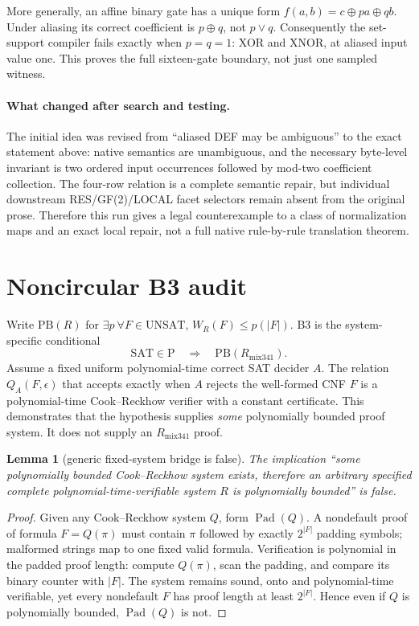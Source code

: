 \documentclass[11pt]{article}
\newtheorem{lemma}{Lemma}
\begin{document}
More generally, an affine binary gate has a unique form $f(a,b)=c\oplus pa\oplus qb$.  Under aliasing its correct coefficient is $p\oplus q$, not $p\lor q$.  Consequently the set-support compiler fails exactly when $p=q=1$: XOR and XNOR, at aliased input value one.  This proves the full sixteen-gate boundary, not just one sampled witness.

\paragraph{What changed after search and testing.}
The initial idea was revised from ``aliased DEF may be ambiguous'' to the exact statement above: native semantics are unambiguous, and the necessary byte-level invariant is two ordered input occurrences followed by mod-two coefficient collection.  The four-row relation is a complete semantic repair, but individual downstream RES/GF(2)/LOCAL facet selectors remain absent from the original prose.  Therefore this run gives a legal counterexample to a class of normalization maps and an exact local repair, not a full native rule-by-rule translation theorem.

\section{Noncircular B3 audit}

Write $\mathrm{PB}(R)$ for $\exists p\ \forall F\in\mathrm{UNSAT}$, $W_R(F)\le p(|F|)$.  B3 is the system-specific conditional
\[
  \mathrm{SAT}\in\mathrm P\quad\Longrightarrow\quad \mathrm{PB}(R_{\mathrm{mix341}}).
\]
Assume a fixed uniform polynomial-time correct SAT decider $A$.  The relation $Q_A(F,\epsilon)$ that accepts exactly when $A$ rejects the well-formed CNF $F$ is a polynomial-time Cook--Reckhow verifier with a constant certificate.  This demonstrates that the hypothesis supplies \emph{some} polynomially bounded proof system.  It does not supply an $R_{\mathrm{mix341}}$ proof.

\begin{lemma}[generic fixed-system bridge is false]\label{lem:pad}
The implication ``some polynomially bounded Cook--Reckhow system exists, therefore an arbitrary specified complete polynomial-time-verifiable system $R$ is polynomially bounded'' is false.
\end{lemma}
\begin{proof}
Given any Cook--Reckhow system $Q$, form $\operatorname{Pad}(Q)$.  A nondefault proof of formula $F=Q(\pi)$ must contain $\pi$ followed by exactly $2^{|F|}$ padding symbols; malformed strings map to one fixed valid formula.  Verification is polynomial in the padded proof length: compute $Q(\pi)$, scan the padding, and compare its binary counter with $|F|$.  The system remains sound, onto and polynomial-time verifiable, yet every nondefault $F$ has proof length at least $2^{|F|}$.  Hence even if $Q$ is polynomially bounded, $\operatorname{Pad}(Q)$ is not.
\end{proof}
\end{document}
